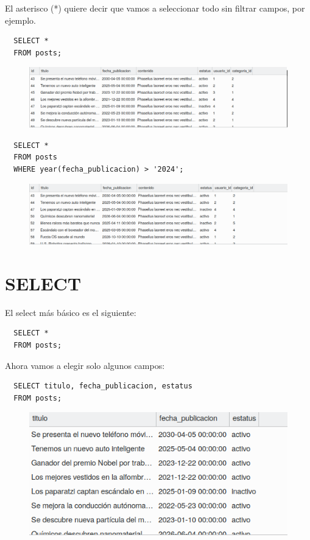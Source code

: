 \documentclass{article}
\begin{document}
El asterisco (*) quiere decir que vamos a seleccionar todo sin filtrar campos, por ejemplo.

\begin{verbatim}
  SELECT *
  FROM posts;
\end{verbatim}
\begin{figure}[h!]
  \centering
  \includegraphics[scale=0.55]{./Pictures/079_select_year.png}
\end{figure}

\begin{verbatim}
  SELECT *
  FROM posts
  WHERE year(fecha_publicacion) > '2024';
\end{verbatim}

\begin{figure}[h!]
  \centering
  \includegraphics[scale=0.55]{./Pictures/079_select_ast.png}
\end{figure}



\section{SELECT}%
El select más básico es el siguiente:
\begin{verbatim}
  SELECT *
  FROM posts;
\end{verbatim}

Ahora vamos a elegir solo algunos campos:
\begin{verbatim}
  SELECT titulo, fecha_publicacion, estatus
  FROM posts;
\end{verbatim}
\begin{figure}[h!]
  \centering
  \includegraphics[scale=0.55]{./Pictures/080_select.png}
\end{figure}
\end{document}
